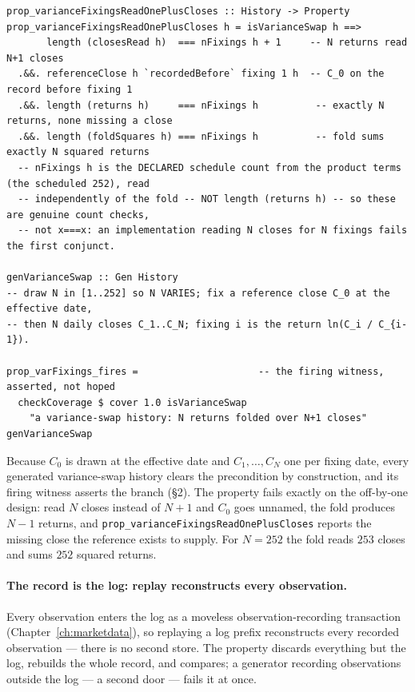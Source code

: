 \documentclass[11pt,a4paper]{article}
\begin{document}
\begin{lstlisting}
prop_varianceFixingsReadOnePlusCloses :: History -> Property
prop_varianceFixingsReadOnePlusCloses h = isVarianceSwap h ==>
       length (closesRead h)  === nFixings h + 1     -- N returns read N+1 closes
  .&&. referenceClose h `recordedBefore` fixing 1 h  -- C_0 on the record before fixing 1
  .&&. length (returns h)     === nFixings h          -- exactly N returns, none missing a close
  .&&. length (foldSquares h) === nFixings h          -- fold sums exactly N squared returns
  -- nFixings h is the DECLARED schedule count from the product terms (the scheduled 252), read
  -- independently of the fold -- NOT length (returns h) -- so these are genuine count checks,
  -- not x===x: an implementation reading N closes for N fixings fails the first conjunct.

genVarianceSwap :: Gen History
-- draw N in [1..252] so N VARIES; fix a reference close C_0 at the effective date,
-- then N daily closes C_1..C_N; fixing i is the return ln(C_i / C_{i-1}).

prop_varFixings_fires =                     -- the firing witness, asserted, not hoped
  checkCoverage $ cover 1.0 isVarianceSwap
    "a variance-swap history: N returns folded over N+1 closes" genVarianceSwap
\end{lstlisting}

Because $C_0$ is drawn at the effective date and $C_1,\dots,C_N$ one per fixing
date, every generated variance-swap history clears the precondition by construction,
and its firing witness asserts the branch (\S 2). The property fails exactly on the off-by-one
design: read $N$ closes
instead of $N+1$ and $C_0$ goes unnamed, the fold produces $N-1$ returns, and
\texttt{prop\_varianceFixingsReadOnePlusCloses} reports the missing close the
reference exists to supply. For $N = 252$ the fold reads $253$ closes and sums $252$
squared returns.

\paragraph{The record is the log: replay reconstructs every observation.}
Every observation enters the log as a moveless observation-recording transaction
(Chapter~\ref{ch:marketdata}), so replaying a log prefix reconstructs every recorded
observation --- there is no second store. The property discards everything but the log,
rebuilds the whole record, and compares; a generator recording observations outside the log
--- a second door --- fails it at once.
\end{document}
